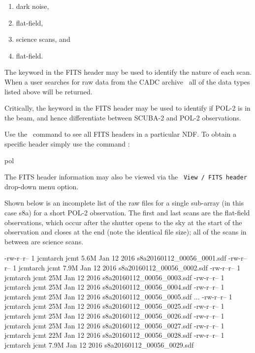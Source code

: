 \begin{enumerate}\itemsep-0.2em
\item dark noise,
\item flat-field,
\item science scans, and
\item flat-field.
\end{enumerate}


The  keyword in the FITS header may be used to
identify the nature of each scan.  When a user searches for raw data from the
CADC archive
\
all of the data types listed above will be returned.


Critically, the  keyword in the FITS header may be used
to identify if POL-2 is in the beam, and hence differentiate between
SCUBA-2 and POL-2 observations.


\begin{tip}
  Use the \Kappa\ command  to
  see all FITS headers in a
  particular NDF. To obtain a specific header simply use the command
  \xref{\task{fitsval}}{sun95}{FITSVAL} :
  \begin{terminalv}
pol
\end{terminalv}
The FITS header information may also be viewed via the \gaia\
\texttt{View / FITS header} drop-down menu option.
\end{tip}

Shown below is an incomplete list of the raw files for a single
sub-array (in this case s8a) for a short POL-2 observation. The first
and last scans are the flat-field observations, which occur after the
shutter opens to the sky at the start of the observation and closes at
the end (note the identical file size); all of the scans in between
are science scans.


\begin{terminalv}
\end{terminalv}

\begin{terminalv}
-rw-r--r-- 1 jcmtarch jcmt 5.6M Jan 12  2016 s8a20160112_00056_0001.sdf
-rw-r--r-- 1 jcmtarch jcmt 7.9M Jan 12  2016 s8a20160112_00056_0002.sdf
-rw-r--r-- 1 jcmtarch jcmt  25M Jan 12  2016 s8a20160112_00056_0003.sdf
-rw-r--r-- 1 jcmtarch jcmt  25M Jan 12  2016 s8a20160112_00056_0004.sdf
-rw-r--r-- 1 jcmtarch jcmt  25M Jan 12  2016 s8a20160112_00056_0005.sdf
...
-rw-r--r-- 1 jcmtarch jcmt  25M Jan 12  2016 s8a20160112_00056_0025.sdf
-rw-r--r-- 1 jcmtarch jcmt  25M Jan 12  2016 s8a20160112_00056_0026.sdf
-rw-r--r-- 1 jcmtarch jcmt  25M Jan 12  2016 s8a20160112_00056_0027.sdf
-rw-r--r-- 1 jcmtarch jcmt  22M Jan 12  2016 s8a20160112_00056_0028.sdf
-rw-r--r-- 1 jcmtarch jcmt 7.9M Jan 12  2016 s8a20160112_00056_0029.sdf
\end{terminalv}

